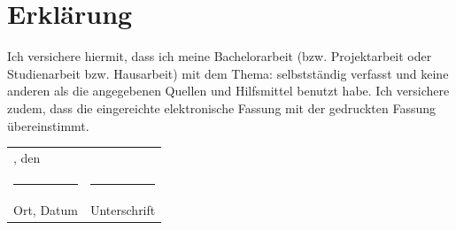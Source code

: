 \section*{Erklärung}
Ich versichere hiermit, dass ich meine Bachelorarbeit (bzw. Projektarbeit oder Studienarbeit bzw.
Hausarbeit) mit dem Thema: \thetitle{} selbstständig verfasst und keine anderen als die angegebenen Quellen und Hilfsmittel benutzt habe. Ich versichere zudem, dass die eingereichte elektronische Fassung
mit der gedruckten Fassung übereinstimmt.\\%
\newline%
\newline%
\begin{tabularx}{\textwidth}{ll}
\location{}, den \turnindate{}&\\
\rule{7cm}{1pt} & \rule{4.5cm}{1pt}\\
Ort, Datum & Unterschrift
\end{tabularx}